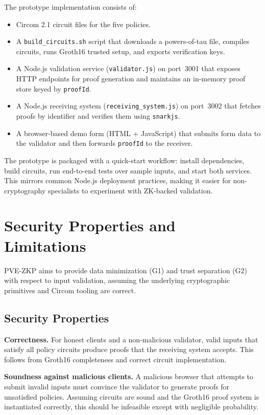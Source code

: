 \documentclass[conference]{IEEEtran}
\begin{document}
The prototype implementation consists of:
\begin{itemize}[leftmargin=*]
  \item Circom 2.1 circuit files for the five policies.
  \item A \texttt{build\_circuits.sh} script that downloads a powers-of-tau file,
    compiles circuits, runs Groth16 trusted setup, and exports verification keys.
  \item A Node.js validation service (\texttt{validator.js}) on port~3001 that
    exposes HTTP endpoints for proof generation and maintains an in-memory proof
    store keyed by \texttt{proofId}.
  \item A Node.js receiving system (\texttt{receiving\_system.js}) on port~3002
    that fetches proofs by identifier and verifies them using \texttt{snarkjs}.
  \item A browser-based demo form (HTML + JavaScript) that submits form data to
    the validator and then forwards \texttt{proofId} to the receiver.
\end{itemize}

The prototype is packaged with a quick-start workflow: install dependencies,
build circuits, run end-to-end tests over sample inputs, and start both
services. This mirrors common Node.js deployment practices, making it easier for
non-cryptography specialists to experiment with ZK-backed validation.

\section{Security Properties and Limitations}

PVE-ZKP aims to provide data minimization (G1) and trust separation (G2) with
respect to input validation, assuming the underlying cryptographic primitives
and Circom tooling are correct.

\subsection{Security Properties}

\textbf{Correctness.} For honest clients and a non-malicious validator, valid
inputs that satisfy all policy circuits produce proofs that the receiving system
accepts. This follows from Groth16 completeness and correct circuit
implementation.

\textbf{Soundness against malicious clients.} A malicious browser that attempts
to submit invalid inputs must convince the validator to generate proofs for
unsatisfied policies. Assuming circuits are sound and the Groth16 proof system
is instantiated correctly, this should be infeasible except with negligible
probability.
\end{document}
